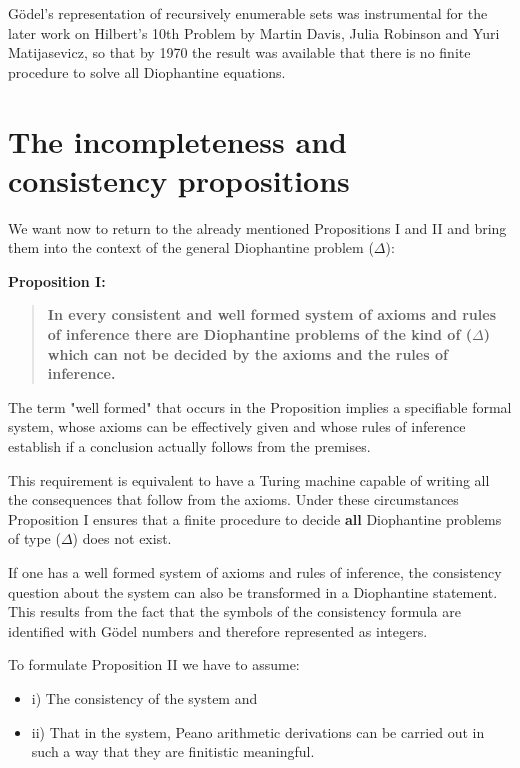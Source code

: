 \documentclass[12pt]{article}
\begin{document}
G\"{o}del's representation of recursively enumerable sets was instrumental for the later work on Hilbert's 10th Problem by Martin Davis, Julia Robinson and Yuri Matijasevicz, so that by 1970 the result was available that there is no finite procedure to solve all Diophantine equations.

\section{The incompleteness and consistency propositions}\normalsize

We want now to return to the already mentioned Propositions I and II and bring them into the context of the general Diophantine problem ($\Delta$):

\textbf{Proposition I:}

\begin{quote}
\textbf{In every consistent and well formed system of axioms and rules of inference there are Diophantine problems of the kind of ($\Delta$) which can not be decided by the axioms and the rules of inference.}
\end{quote}

The term "well formed" that occurs in the Proposition implies a specifiable formal system, whose axioms can be effectively given and whose rules of inference establish if a conclusion actually follows from the premises.

This requirement is equivalent to have a Turing machine capable of writing all the consequences that follow from the axioms. Under these circumstances Proposition I ensures that a finite procedure to decide \textbf{all} Diophantine problems of type ($\Delta$) does not exist.

If one has a well formed system of axioms and rules of inference, the consistency question about the system can also  be transformed in a Diophantine statement. This results from the fact that the symbols of the consistency formula are identified with G\"{o}del numbers and therefore represented as integers.

To formulate Proposition II we have to assume:

\begin{itemize}
\item i) The consistency of the system and 

\item ii) That in the system, Peano arithmetic derivations can be carried out in such a way that they are finitistic meaningful.
\end{itemize}
\end{document}
